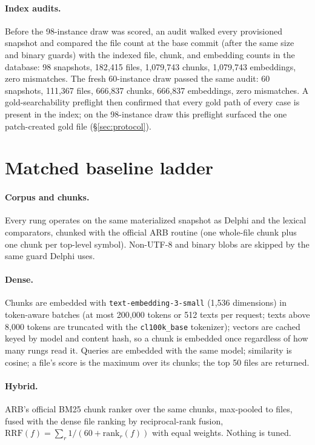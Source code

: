 \documentclass{article}
\newcommand{\system}{Delphi}
\begin{document}
\paragraph{Index audits.} Before the 98-instance draw was scored, an audit walked every provisioned snapshot and compared the file count at the base commit (after the same size and binary guards) with the indexed file, chunk, and embedding counts in the database: 98 snapshots, 182{,}415 files, 1{,}079{,}743 chunks, 1{,}079{,}743 embeddings, zero mismatches. The fresh 60-instance draw passed the same audit: 60 snapshots, 111{,}367 files, 666{,}837 chunks, 666{,}837 embeddings, zero mismatches. A gold-searchability preflight then confirmed that every gold path of every case is present in the index; on the 98-instance draw this preflight surfaced the one patch-created gold file (\S\ref{sec:protocol}).

\section{Matched baseline ladder}
\label{app:ladder}

\paragraph{Corpus and chunks.} Every rung operates on the same materialized snapshot as \system{} and the lexical comparators, chunked with the official ARB routine (one whole-file chunk plus one chunk per top-level symbol). Non-UTF-8 and binary blobs are skipped by the same guard \system{} uses.

\paragraph{Dense.} Chunks are embedded with \texttt{text-embedding-3-small} (1{,}536 dimensions) in token-aware batches (at most 200{,}000 tokens or 512 texts per request; texts above 8{,}000 tokens are truncated with the \texttt{cl100k\_base} tokenizer); vectors are cached keyed by model and content hash, so a chunk is embedded once regardless of how many rungs read it. Queries are embedded with the same model; similarity is cosine; a file's score is the maximum over its chunks; the top 50 files are returned.

\paragraph{Hybrid.} ARB's official BM25 chunk ranker over the same chunks, max-pooled to files, fused with the dense file ranking by reciprocal-rank fusion, $\mathrm{RRF}(f)=\sum_{r}1/(60+\mathrm{rank}_r(f))$ with equal weights. Nothing is tuned.
\end{document}
